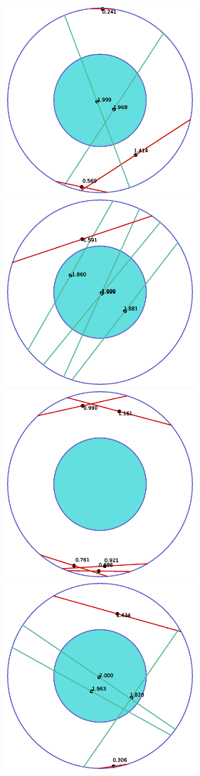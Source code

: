 \begin{figure}[H]
    \centering
    \includegraphics[width=7cm]{Graphics/circle_3_1.eps}
    \includegraphics[width=7cm]{Graphics/circle_3_2.eps}
    \includegraphics[width=7cm]{Graphics/circle_3_3.eps}
    \includegraphics[width=7cm]{Graphics/circle_3_4.eps}
    \caption{}
\end{figure}